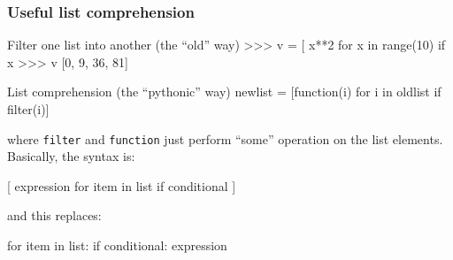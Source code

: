 \documentclass[hyperref={colorlinks=true}]{beamer}
\begin{document}

\begin{frame}[fragile]
  \frametitle{Useful list comprehension}

    \begin{ucpythonblock}{Filter one list into another (the ``old'' way)}
>>> v = [ x**2 for x in range(10) if x %
>>> v
[0, 9, 36, 81]
    \end{ucpythonblock}

    \begin{ucpythonblock}{List comprehension (the ``pythonic'' way)}
newlist = [function(i) for i in oldlist if filter(i)]
    \end{ucpythonblock}

where \texttt{filter} and \texttt{function} just perform ``some'' operation on the list elements. Basically, the syntax is:
    \begin{ucpythonblock}{}
[ expression for item in list if conditional ] 
    \end{ucpythonblock}

and this replaces:
    \begin{ucpythonblock}{}
for item in list:
  if conditional:
    expression
    \end{ucpythonblock}


\end{frame}

\end{document}
